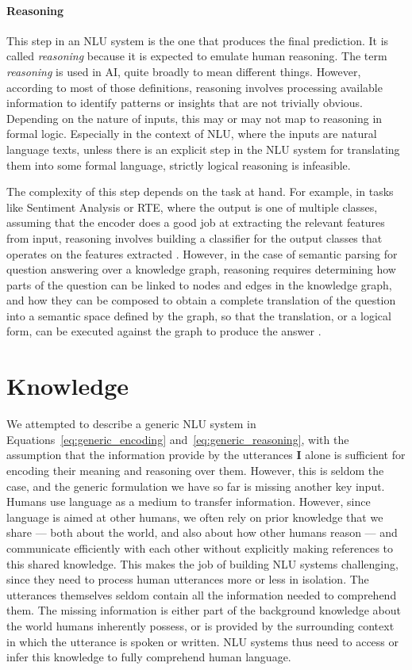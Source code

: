 \paragraph{Reasoning} This step in an NLU system is the one that produces the final prediction. It is called
\textit{reasoning} because it is expected to emulate human reasoning.  The term \textit{reasoning} is used in
AI, quite broadly to mean different things. However, according to most of those definitions, reasoning
involves processing available information to identify patterns or insights that are not trivially obvious.
Depending on the nature of inputs, this may or may not map to reasoning in formal logic. Especially in the
context of NLU, where the inputs are natural language texts, unless there is an explicit step in the NLU
system for translating them into some formal language, strictly logical reasoning is infeasible.


The complexity of this step depends on the task at hand.  For example, in tasks like Sentiment Analysis
or RTE, where the output is one of multiple classes, assuming that the encoder does a good job at
extracting the relevant features from input, reasoning involves building a classifier for the output
classes that operates on the features extracted \citep{pang2002thumbs}. However, in the case of
semantic parsing for question answering over a knowledge graph, reasoning requires determining how
parts of the question can be linked to nodes and edges in the knowledge graph, and how they can be
composed to obtain a complete translation of the question into a semantic space defined by the
graph, so that the translation, or a logical form, can be executed against the graph to produce the
answer \citep{Zettlemoyer2005LearningTM}.

\section{Knowledge}\label{sec:intro_external_knowledge} We attempted to describe a generic NLU
system in Equations~\ref{eq:generic_encoding} and~\ref{eq:generic_reasoning}, with the assumption
that the information provide by the utterances $\textbf{I}$ alone is sufficient for encoding their
meaning and reasoning over them. However, this is seldom the case, and the generic formulation we
have so far is missing another key input.  Humans use language as a medium to transfer information.
However, since language is aimed at other humans, we often rely on prior knowledge that we share ---
both about the world, and also about how other humans reason --- and communicate efficiently with
each other without explicitly making references to this shared knowledge. This makes the job of
building NLU systems challenging, since they need to process human utterances more or less in
isolation. The utterances themselves seldom contain all the information needed to comprehend them.
The missing information is either part of the background knowledge about the world humans inherently
possess, or is provided by the surrounding context in which the utterance is spoken or written. NLU
systems thus need to access or infer this knowledge to fully comprehend human language.

